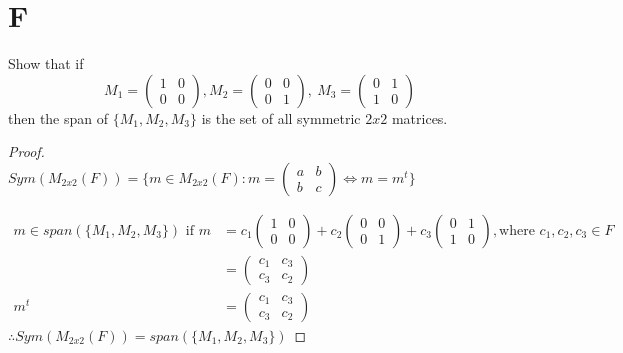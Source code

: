 \documentclass[11pt]{scrartcl}
\makeatletter
\newenvironment{Dequation}
  {%
  \def\tagform@##1{%
    \maketag@@@{\makebox[0pt][r]{(\ignorespaces##1\unskip\@@italiccorr)}}}%
  \ignorespaces
  }
  {%
  \def\tagform@##1{\maketag@@@{(\ignorespaces##1\unskip\@@italiccorr)}}%
  \ignorespacesafterend
  }
\makeatother
\begin{document}
\section{F}
Show that if 
\[
M_1 = 
\begin{pmatrix}
1 & 0 \\
0 & 0 
\end{pmatrix},
M_2 = 
\begin{pmatrix}
0 & 0 \\
0 & 1 
\end{pmatrix},
\
M_3 = 
\begin{pmatrix}
0 & 1 \\
1 & 0 
\end{pmatrix}
\]
then the span of $\{M_1, M_2, M_3\}$ is the set of all symmetric $2x2$ matrices.

\begin{proof}
	\-\\
	$Sym(M_{2x2}(F)) = \{m \in M_{2x2}(F): m = \begin{pmatrix} a & b \\ b & c \end{pmatrix}  \Leftrightarrow m = m^t\}$
	\begin{Dequation}
	\begin{align*}
		m \in span(\{M_1, M_2, M_3\}) \text{ if } m & = c_1 
	\begin{pmatrix}
	1 & 0 \\
	0 & 0 
	\end{pmatrix}+
	c_2
	\begin{pmatrix}
	0 & 0 \\
	0 & 1 
	\end{pmatrix}+
	c_3
	\begin{pmatrix}
	0 & 1 \\
	1 & 0 
	\end{pmatrix}, \text{where } c_1, c_2, c_3 \in F\\
	& =\begin{pmatrix}
	c_1 & c_3 \\
	c_3 & c_2 
	\end{pmatrix}\\
		m^t & = 
	\begin{pmatrix}
	c_1 & c_3 \\
	c_3 & c_2 
	\end{pmatrix}
	\end{align*}
	\end{Dequation}
	$\therefore Sym(M_{2x2}(F)) = span(\{M_1, M_2, M_3\})$
\end{proof}
\end{document}
